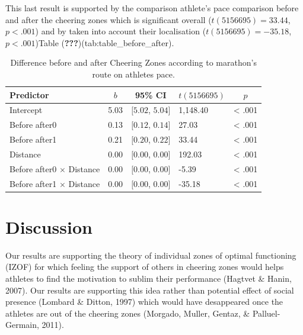 \documentclass[,man]{apa6}
\theoremstyle{definition}
\theoremstyle{definition}
\theoremstyle{definition}
\theoremstyle{remark}
\begin{document}
This last result is supported by the comparison athlete's pace
comparison before and after the cheering zones which is significant
overall (\(t(5156695) = 33.44\), \(p < .001\)) and by taken into account
their localisation (\(t(5156695) = -35.18\), \(p < .001\))Table
({\textbf{???}})(tab:table\_before\_after).

\begin{table}[tbp]
\begin{center}
\begin{threeparttable}
\caption{\label{tab:table_before_after}Difference before and after Cheering Zones according to marathon's route on athletes pace.}
\begin{tabular}{lllll}
\toprule
Predictor & \multicolumn{1}{c}{$b$} & \multicolumn{1}{c}{95\% CI} & \multicolumn{1}{c}{$t(5156695)$} & \multicolumn{1}{c}{$p$}\\
\midrule
Intercept & 5.03 & $[5.02$, $5.04]$ & 1,148.40 & < .001\\
Before after0 & 0.13 & $[0.12$, $0.14]$ & 27.03 & < .001\\
Before after1 & 0.21 & $[0.20$, $0.22]$ & 33.44 & < .001\\
Distance & 0.00 & $[0.00$, $0.00]$ & 192.03 & < .001\\
Before after0 $\times$ Distance & 0.00 & $[0.00$, $0.00]$ & -5.39 & < .001\\
Before after1 $\times$ Distance & 0.00 & $[0.00$, $0.00]$ & -35.18 & < .001\\
\bottomrule
\end{tabular}
\end{threeparttable}
\end{center}
\end{table}

\section{Discussion}\label{discussion}

Our results are supporting the theory of individual zones of optimal
functioning (IZOF) for which feeling the support of others in cheering
zones would helps athletes to find the motivation to sublim their
performance (Hagtvet \& Hanin, 2007). Our results are supporting this
idea rather than potential effect of social presence (Lombard \& Ditton,
1997) which would have desappeared once the athletes are out of the
cheering zones (Morgado, Muller, Gentaz, \& Palluel-Germain, 2011).

\newpage
\end{document}
